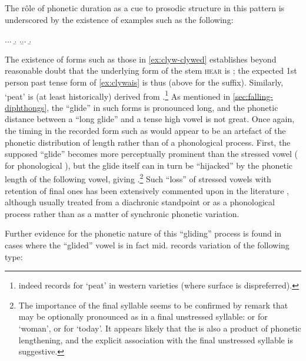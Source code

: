 The rôle of phonetic duration as a cue to prosodic structure in this pattern is underscored by the existence of examples such as the following:

\ex.\a.\label{ex:clywais}\a.
\b.
\z.\b.\label{ex:clyw-clywed}\a.
\b.

The existence of forms such as those in \cref{ex:clyw-clywed} establishes beyond reasonable doubt that the underlying form of the stem \textsc{hear} is ; the expected 1st person past tense form of \cref{ex:clywais} is thus \ipa{[ˈkləues]} (\cf above \ipa{[ˈbiːes]} for the suffix). Similarly,  \ipa{[ˈtuːarχ]} `peat' is (at least historically) derived from \ipa{[ˈtəuarχ]}.\footnote{\citet[p.~154]{awbery86:_pembr_welsh} indeed records \ipa{[ˈtowarχ]} for `peat' in western varieties (where surface \ipa{[ə]} is dispreferred).} As mentioned in \cref{sec:falling-diphthongs}, the \enquote{glide} in such forms is pronounced long, and the phonetic distance between a \enquote{long glide} and a tense high vowel is not great. Once again, the timing in the recorded form such as  would appear to be an artefact of the phonetic distribution of length rather than of a phonological process. First, the supposed \enquote{glide} becomes more perceptually prominent than the stressed vowel ( for phonological \ipa{[ˈkləues]}), but the glide itself can in turn be \enquote{hijacked} by the phonetic length of the following vowel, giving .\footnote{The importance of the final syllable seems to be confirmed by  remark that \ipa{[i]} may be optionally pronounced as  in a final unstressed syllable:  or  for \ipa{[ˈmeniw]} `woman',  or  for \ipa{[ˈheːðiw]} `today'. It appears likely that the  is also a product of phonetic lengthening, and the explicit association with the final unstressed syllable is suggestive.} Such \enquote{loss} of stressed vowels with retention of final ones has been extensively commented upon in the literature \citep{jones49:_moder_welsh,watkins76:_cyfnew_gymraeg,bosch96:_promin}, although usually treated from a diachronic standpoint or as a phonological process rather than as a matter of synchronic phonetic variation.

Further evidence for the phonetic nature of this \enquote{gliding} process is found in cases where the \enquote{glided} vowel is in fact mid. \citet{awbery86:_pembr_welsh} records variation of the following type:

